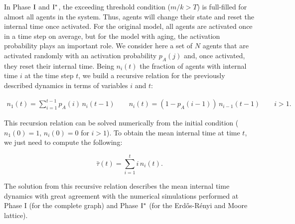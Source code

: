 
In Phase ${\rm I}$ and ${\rm I}^{*}$, the exceeding threshold condition ($m/k > T$) is full-filled for almost all agents in the system. Thus, agents will change their state and reset the internal time once activated. For the original model, all agents are activated once in a time step on average, but for the model with aging, the activation probability plays an important role. We consider here a set of $N$ agents that are activated randomly with an activation probability $p_A(j)$ and, once activated, they reset their internal time. Being $n_i(t)$ the fraction of agents with internal time $i$ at the time step $t$, we build a recursive relation for the previously described dynamics in terms of variables $i$ and $t$:

\begin{eqnarray}
    n_1(t) = \sum_{i=1}^{t-1} p_A(i) \, n_i(t-1) \quad \quad n_i(t) = (1 - p_A(i-1) ) \, n_{i-1}(t-1)  \qquad i > 1. \label{eq:RR1}
\end{eqnarray}

This recursion relation can be solved numerically from the initial condition ($n_1(0) = 1$, $n_i(0) = 0$ for $i > 1$). To obtain the mean internal time at time $t$, we just need to compute the following:

\begin{equation}
    \label{eq:RR}
    \bar{\tau}(t) = \sum_{i=1}^{t} i \, n_i(t).
\end{equation}

The solution from this recursive relation describes the mean internal time dynamics with great agreement with the numerical simulations performed at Phase I (for the complete graph) and Phase ${\rm  I}^{*}$ (for the Erd\H{o}s-R\'enyi and Moore lattice).